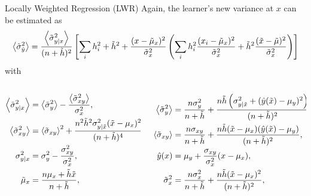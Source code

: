 \begin{frame}{Locally Weighted Regression (LWR)}
Again, the learner's new variance at $x$ can be estimated as
\footnotesize
\begin{equation}
\left< \tilde{\sigma}_{\hat{y}}^2 \right> = \frac{\left< \tilde{\sigma}_{y|x}^2 \right>}{(n+\tilde{h})^2}
\left[ \sum_i h_i^2 + \tilde{h}^2 + \frac{(x-\tilde{\mu}_x)^2}{\tilde{\sigma}_x^2}
\left( \sum_i h_i^2 \frac{(x_i - \tilde{\mu}_x)^2}{\tilde{\sigma}_x^2} +
\tilde{h}^2 \frac{(\tilde{x}-\tilde{\mu})^2}{\tilde{\sigma}_x^2} \right) \right]
\end{equation}
\normalsize
with
\footnotesize
\begin{columns}[t]
\begin{column}{0.45\textwidth}
\[\begin{split}
\left< \tilde{\sigma}_{y|x}^2 \right> &= \left< \tilde{\sigma}_{y}^2 \right> - \frac{\left< \tilde{\sigma}_{xy}^2 \right>}{\sigma_{x}^2},\\
\left< \tilde{\sigma}_{xy}^2 \right> &= \left< \tilde{\sigma}_{xy} \right>^2 +
\frac{n^2\tilde{h}^2\sigma_{y|\tilde{x}}^2(\tilde{x}-\mu_{x})^2}{(n+\tilde{h})^4},\\
\sigma_{y|x}^2 &= \sigma_{y}^2 - \frac{\sigma_{xy}^2}{\sigma_{x}^2},\\
\tilde{\mu}_x &= \frac{n\mu_x+\tilde{h}\tilde{x}}{n+\tilde{h}},
\end{split}\]
\end{column}
\begin{column}{0.55\textwidth}
\[\begin{split}
\left< \tilde{\sigma}_{y}^2 \right> &= \frac{n\sigma_{y}^2}{n+\tilde{h}} +
\frac{n\tilde{h} \left( \sigma_{y|\tilde{x}}^2 + (\hat{y}(\tilde{x})-\mu_{y})^2 \right)}
{(n+\tilde{h})^2}, \\
\left< \tilde{\sigma}_{xy} \right> &= \frac{n\sigma_{xy}}{n+\tilde{h}} +
\frac{n \tilde{h} (\tilde{x}-\mu_{x})(\hat{y}(\tilde{x})-\mu_{y})}{(n+\tilde{h})^2},\\
\hat{y}(x) &= \mu_{y} + \frac{\sigma_{xy}}{\sigma_{x}^2}(x-\mu_{x}),\\
\tilde{\sigma}_{x}^2 &= \frac{n\sigma_{x}^2}{n+\tilde{h}} +
\frac{n \tilde{h} (\tilde{x}-\mu_{x})^2}{(n+\tilde{h})^2},\\
\end{split}\]
\end{column}
\end{columns}
\end{frame}


